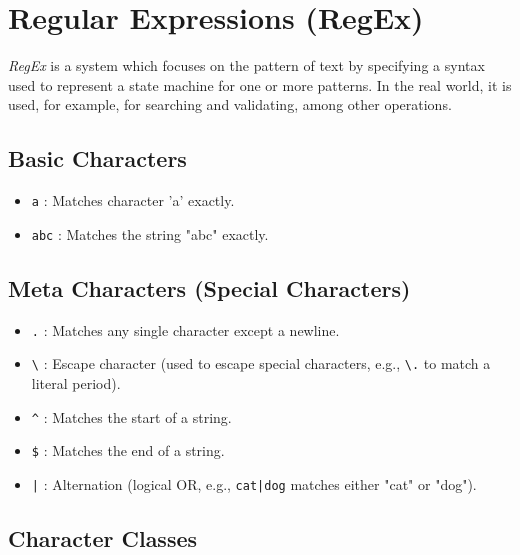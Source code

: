 \chapter{Regular Expressions (RegEx)}

\emph{RegEx} is a system which focuses on the pattern of text by specifying a syntax used to represent a state machine 
for one or more patterns. In the real world, it is used, for example, for searching and validating, among other operations.

\section{Basic Characters}

\begin{itemize}
  
    \item \texttt{a} : Matches character 'a' exactly.
  
    \item \texttt{abc} : Matches the string "abc" exactly.

\end{itemize}

\section{Meta Characters (Special Characters)}

\begin{itemize}

    \item \texttt{.} : Matches any single character except a newline.

    \item \texttt{\textbackslash} : Escape character (used to escape special characters, e.g., \texttt{\textbackslash.} to match a literal period).

    \item \texttt{\^} : Matches the start of a string.

    \item \texttt{\$} : Matches the end of a string.

    \item \texttt{|} : Alternation (logical OR, e.g., \texttt{cat|dog} matches either "cat" or "dog").

\end{itemize}

\section{Character Classes}

